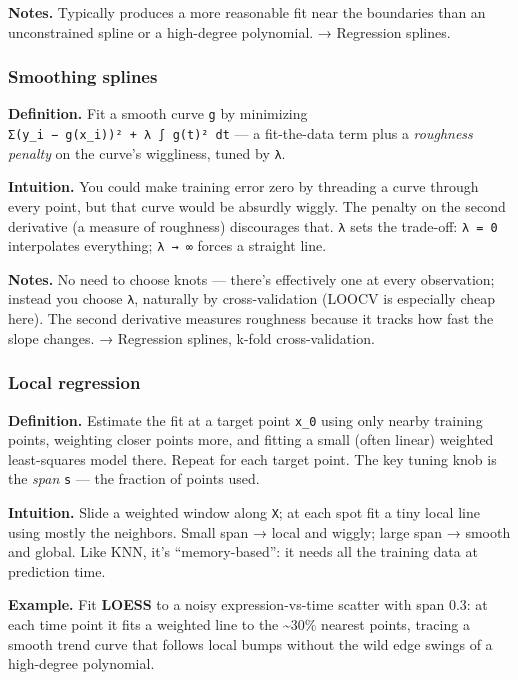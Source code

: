 \documentclass[
  10pt,
  letterpaper,
  onecolumn]{article}
\begin{document}
\textbf{Notes.} Typically produces a more reasonable fit near the
boundaries than an unconstrained spline or a high-degree polynomial. →
Regression splines.

\hypertarget{smoothing-splines}{%
\subsubsection{Smoothing splines}\label{smoothing-splines}}

\textbf{Definition.} Fit a smooth curve \texttt{g} by minimizing
\texttt{Σ(y\_i\ −\ g(x\_i))²\ +\ λ\ ∫\ g\textquotesingle{}\textquotesingle{}(t)²\ dt}
--- a fit-the-data term plus a \emph{roughness penalty} on the curve's
wiggliness, tuned by \texttt{λ}.

\textbf{Intuition.} You could make training error zero by threading a
curve through every point, but that curve would be absurdly wiggly. The
penalty on the second derivative (a measure of roughness) discourages
that. \texttt{λ} sets the trade-off: \texttt{λ\ =\ 0} interpolates
everything; \texttt{λ\ →\ ∞} forces a straight line.

\textbf{Notes.} No need to choose knots --- there's effectively one at
every observation; instead you choose \texttt{λ}, naturally by
cross-validation (LOOCV is especially cheap here). The second derivative
measures roughness because it tracks how fast the slope changes. →
Regression splines, k-fold cross-validation.

\hypertarget{local-regression}{%
\subsubsection{Local regression}\label{local-regression}}

\textbf{Definition.} Estimate the fit at a target point \texttt{x\_0}
using only nearby training points, weighting closer points more, and
fitting a small (often linear) weighted least-squares model there.
Repeat for each target point. The key tuning knob is the \emph{span}
\texttt{s} --- the fraction of points used.

\textbf{Intuition.} Slide a weighted window along \texttt{X}; at each
spot fit a tiny local line using mostly the neighbors. Small span →
local and wiggly; large span → smooth and global. Like KNN, it's
``memory-based'': it needs all the training data at prediction time.

\textbf{Example.} Fit \textbf{LOESS} to a noisy expression-vs-time
scatter with span 0.3: at each time point it fits a weighted line to the
\textasciitilde30\% nearest points, tracing a smooth trend curve that
follows local bumps without the wild edge swings of a high-degree
polynomial.
\end{document}
